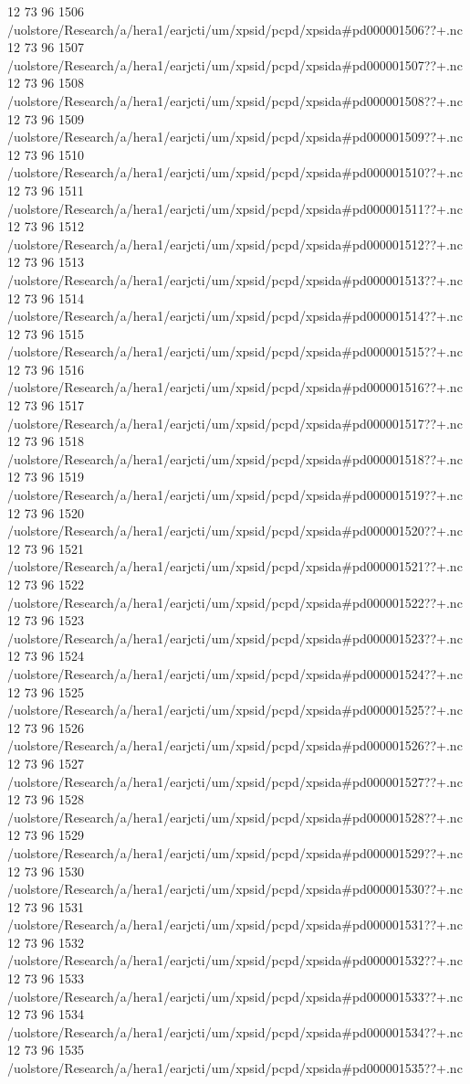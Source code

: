 12 73 96
1506
/uolstore/Research/a/hera1/earjcti/um/xpsid/pcpd/xpsida#pd000001506??+.nc
12 73 96
1507
/uolstore/Research/a/hera1/earjcti/um/xpsid/pcpd/xpsida#pd000001507??+.nc
12 73 96
1508
/uolstore/Research/a/hera1/earjcti/um/xpsid/pcpd/xpsida#pd000001508??+.nc
12 73 96
1509
/uolstore/Research/a/hera1/earjcti/um/xpsid/pcpd/xpsida#pd000001509??+.nc
12 73 96
1510
/uolstore/Research/a/hera1/earjcti/um/xpsid/pcpd/xpsida#pd000001510??+.nc
12 73 96
1511
/uolstore/Research/a/hera1/earjcti/um/xpsid/pcpd/xpsida#pd000001511??+.nc
12 73 96
1512
/uolstore/Research/a/hera1/earjcti/um/xpsid/pcpd/xpsida#pd000001512??+.nc
12 73 96
1513
/uolstore/Research/a/hera1/earjcti/um/xpsid/pcpd/xpsida#pd000001513??+.nc
12 73 96
1514
/uolstore/Research/a/hera1/earjcti/um/xpsid/pcpd/xpsida#pd000001514??+.nc
12 73 96
1515
/uolstore/Research/a/hera1/earjcti/um/xpsid/pcpd/xpsida#pd000001515??+.nc
12 73 96
1516
/uolstore/Research/a/hera1/earjcti/um/xpsid/pcpd/xpsida#pd000001516??+.nc
12 73 96
1517
/uolstore/Research/a/hera1/earjcti/um/xpsid/pcpd/xpsida#pd000001517??+.nc
12 73 96
1518
/uolstore/Research/a/hera1/earjcti/um/xpsid/pcpd/xpsida#pd000001518??+.nc
12 73 96
1519
/uolstore/Research/a/hera1/earjcti/um/xpsid/pcpd/xpsida#pd000001519??+.nc
12 73 96
1520
/uolstore/Research/a/hera1/earjcti/um/xpsid/pcpd/xpsida#pd000001520??+.nc
12 73 96
1521
/uolstore/Research/a/hera1/earjcti/um/xpsid/pcpd/xpsida#pd000001521??+.nc
12 73 96
1522
/uolstore/Research/a/hera1/earjcti/um/xpsid/pcpd/xpsida#pd000001522??+.nc
12 73 96
1523
/uolstore/Research/a/hera1/earjcti/um/xpsid/pcpd/xpsida#pd000001523??+.nc
12 73 96
1524
/uolstore/Research/a/hera1/earjcti/um/xpsid/pcpd/xpsida#pd000001524??+.nc
12 73 96
1525
/uolstore/Research/a/hera1/earjcti/um/xpsid/pcpd/xpsida#pd000001525??+.nc
12 73 96
1526
/uolstore/Research/a/hera1/earjcti/um/xpsid/pcpd/xpsida#pd000001526??+.nc
12 73 96
1527
/uolstore/Research/a/hera1/earjcti/um/xpsid/pcpd/xpsida#pd000001527??+.nc
12 73 96
1528
/uolstore/Research/a/hera1/earjcti/um/xpsid/pcpd/xpsida#pd000001528??+.nc
12 73 96
1529
/uolstore/Research/a/hera1/earjcti/um/xpsid/pcpd/xpsida#pd000001529??+.nc
12 73 96
1530
/uolstore/Research/a/hera1/earjcti/um/xpsid/pcpd/xpsida#pd000001530??+.nc
12 73 96
1531
/uolstore/Research/a/hera1/earjcti/um/xpsid/pcpd/xpsida#pd000001531??+.nc
12 73 96
1532
/uolstore/Research/a/hera1/earjcti/um/xpsid/pcpd/xpsida#pd000001532??+.nc
12 73 96
1533
/uolstore/Research/a/hera1/earjcti/um/xpsid/pcpd/xpsida#pd000001533??+.nc
12 73 96
1534
/uolstore/Research/a/hera1/earjcti/um/xpsid/pcpd/xpsida#pd000001534??+.nc
12 73 96
1535
/uolstore/Research/a/hera1/earjcti/um/xpsid/pcpd/xpsida#pd000001535??+.nc
